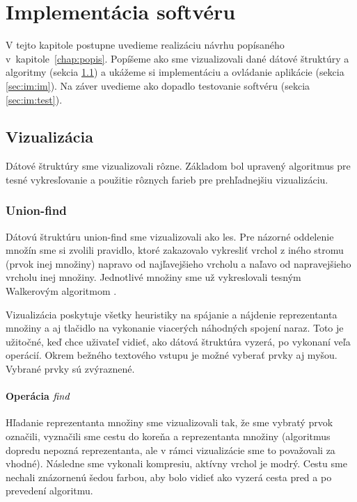 \chapter{Implementácia softvéru}\label{chap:implementacia}

V tejto kapitole postupne uvedieme realizáciu návrhu popísaného 
v~kapitole~\ref{chap:popis}. Popíšeme ako sme vizualizovali dané 
dátové štruktúry a algoritmy (sekcia \ref{sec:im:vis}) a ukážeme si 
implementáciu a ovládanie aplikácie (sekcia \ref{sec:im:im}). 
Na záver uvedieme ako dopadlo testovanie softvéru (sekcia \ref{sec:im:test}).

\section{Vizualizácia}\label{sec:im:vis}

Dátové štruktúry sme vizualizovali rôzne. Základom bol upravený algoritmus pre 
tesné vykresľovanie a použitie rôznych farieb pre prehľadnejšiu vizualizáciu.

\subsection{Union-find}

Dátovú štruktúru union-find sme vizualizovali ako les. Pre názorné 
oddelenie množín sme si zvolili pravidlo, ktoré zakazovalo vykresliť vrchol 
z iného stromu (prvok inej množiny) 
napravo od najľavejšieho vrcholu a naľavo od napravejšieho vrcholu inej 
množiny. Jednotlivé množiny sme už vykreslovali tesným Walkerovým algoritmom 
\citep{walker}. 

Vizualizácia poskytuje všetky heuristiky na spájanie a 
nájdenie reprezentanta množiny a 
aj tlačidlo na vykonanie viacerých náhodných spojení naraz. Toto je užitočné, 
keď chce uživateľ vidieť, ako dátová štruktúra vyzerá, po vykonaní 
veľa operácií. Okrem bežného textového vstupu je možné vyberať prvky aj myšou. 
Vybrané prvky sú zvýraznené.

\subsubsection{Operácia $\mathop{\mathit{find}}$}

Hľadanie reprezentanta množiny sme vizualizovali tak, že sme vybratý prvok 
označili, vyznačili sme cestu do koreňa a reprezentanta množiny 
(algoritmus dopredu nepozná reprezentanta, ale v rámci vizualizácie sme to 
považovali za vhodné). Následne sme vykonali kompresiu, aktívny vrchol je 
modrý. Cestu sme nechali 
znázornenú šedou farbou, aby bolo vidieť ako vyzerá cesta pred a po prevedení 
algoritmu. 

